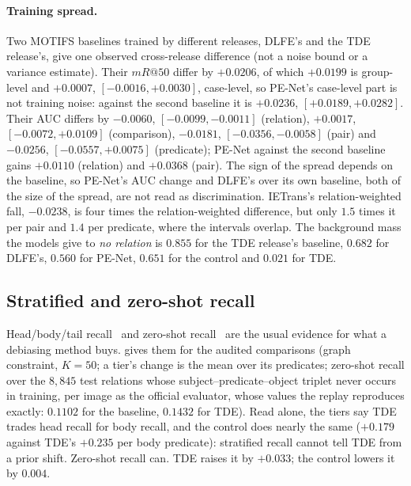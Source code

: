 \paragraph{Training spread.} Two MOTIFS baselines trained by different releases, DLFE's and
the TDE release's, give one observed cross-release difference (not a noise bound or a variance estimate). Their $mR@50$ differ by $+0.0206$, of which $+0.0199$ is group-level and $+0.0007$,
$[-0.0016,+0.0030]$, case-level, so PE-Net's case-level part is not training noise: against the
second baseline it is $+0.0236$, $[+0.0189,+0.0282]$. Their AUC differs by $-0.0060$,
$[-0.0099,-0.0011]$ (relation), $+0.0017$, $[-0.0072,+0.0109]$ (comparison), $-0.0181$,
$[-0.0356,-0.0058]$ (pair) and $-0.0256$, $[-0.0557,+0.0075]$ (predicate); PE-Net against the
second baseline gains $+0.0110$ (relation) and $+0.0368$ (pair). The sign of the spread
depends on the baseline, so PE-Net's AUC change and DLFE's over its own baseline, both of
the size of the spread, are not read as discrimination. IETrans's relation-weighted fall,
$-0.0238$, is four times the relation-weighted difference, but only $1.5$ times it per pair and
$1.4$ per predicate, where the intervals overlap. The background mass the models give to \emph{no relation} is
$0.855$ for the TDE release's baseline, $0.682$ for DLFE's, $0.560$ for PE-Net, $0.651$ for the
control and $0.021$ for TDE.

\subsection{Stratified and zero-shot recall}\label{app:zsrecall}

Head/body/tail recall~\cite{li2021bgnn} and zero-shot recall~\cite{lu2016visual} are the usual
evidence for what a debiasing method buys.  gives them for the audited
comparisons (graph constraint, $K=50$; a tier's change is the mean over its predicates; zero-shot
recall over the $8{,}845$ test relations whose subject--predicate--object triplet never occurs in
training, per image as the official evaluator, whose values the replay reproduces exactly:
$0.1102$ for the baseline, $0.1432$ for TDE). Read alone, the tiers say TDE trades head recall
for body recall, and the control does nearly the same ($+0.179$ against TDE's $+0.235$ per body
predicate): stratified recall cannot tell TDE from a prior shift. Zero-shot recall can. TDE raises
it by $+0.033$; the control lowers it by $0.004$.

